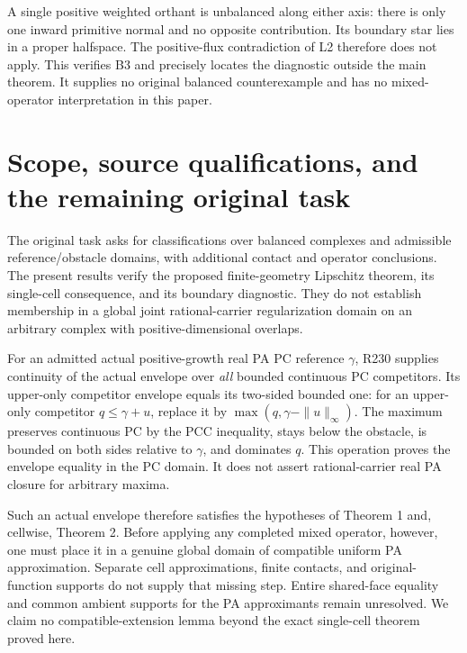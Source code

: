 \documentclass[
  11pt,
]{article}
\begin{document}
A single positive weighted orthant is unbalanced along either axis:
there is only one inward primitive normal and no opposite contribution.
Its boundary star lies in a proper halfspace. The positive-flux
contradiction of L2 therefore does not apply. This verifies B3 and
precisely locates the diagnostic outside the main theorem. It supplies
no original balanced counterexample and has no mixed-operator
interpretation in this paper.

\section{Scope, source qualifications, and the remaining original
task}\label{scope-source-qualifications-and-the-remaining-original-task}

The original task asks for classifications over balanced complexes and
admissible reference/obstacle domains, with additional contact and
operator conclusions. The present results verify the proposed
finite-geometry Lipschitz theorem, its single-cell consequence, and its
boundary diagnostic. They do not establish membership in a global joint
rational-carrier regularization domain on an arbitrary complex with
positive-dimensional overlaps.

For an admitted actual positive-growth real PA PC reference \(\gamma\),
R230 supplies continuity of the actual envelope over \emph{all} bounded
continuous PC competitors. Its upper-only competitor envelope equals its
two-sided bounded one: for an upper-only competitor \(q\leq\gamma+u\),
replace it by \(\max(q,\gamma-\|u\|_\infty)\). The maximum preserves
continuous PC by the PCC inequality, stays below the obstacle, is
bounded on both sides relative to \(\gamma\), and dominates \(q\). This
operation proves the envelope equality in the PC domain. It does not
assert rational-carrier real PA closure for arbitrary maxima.

Such an actual envelope therefore satisfies the hypotheses of Theorem 1
and, cellwise, Theorem 2. Before applying any completed mixed operator,
however, one must place it in a genuine global domain of compatible
uniform PA approximation. Separate cell approximations, finite contacts,
and original-function supports do not supply that missing step. Entire
shared-face equality and common ambient supports for the PA approximants
remain unresolved. We claim no compatible-extension lemma beyond the
exact single-cell theorem proved here.
\end{document}

